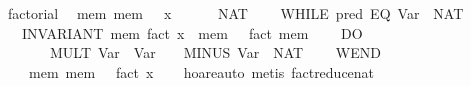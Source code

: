 \documentclass{llncs}
\begin{document}
\begin{isabellebody}
\isanewline
{}\isamarkupfalse%
\ factorial{}\isanewline
\ \ {}{}mem{}\ mem\ {}\ {}\ x{}\ {}\isanewline
\ \ \ {}\ {}{}\ NAT\ {}{}\isanewline
\ \ \ {}WHILE\ {}{}pred\ {}EQ\ {}Var\ {}{}\ {}NAT\ {}{}{}{}\isanewline
\ \ \ INVARIANT\ {}mem{}\ fact\ x\ {}\ mem\ {}\ {}\ fact\ {}mem\ {}{}{}\isanewline
\ \ \ DO\isanewline
\ \ \ \ \ {}\ {}{}\ MULT\ {}Var\ {}{}\ {}Var\ {}{}{}\ {}\ {}{}\ MINUS\ {}Var\ {}{}\ {}NAT\ {}{}\isanewline
\ \ \ WEND{}\isanewline
\ \ \ {}\ {}mem{}\ mem\ {}\ {}\ fact\ x{}{}\isanewline
%
\isadelimproof
\ \ %
\endisadelimproof
%
\isatagproof
{}\isamarkupfalse%
\ hoare{}auto\ {}metis\ fact{}reduce{}nat{}%
\endisatagproof
\end{isabellebody}
\end{document}
